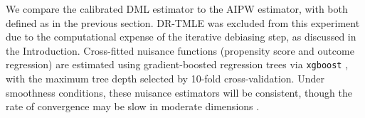 \documentclass[11pt]{article}
\theoremstyle{plain}
\begin{document}
We compare the calibrated DML estimator to the AIPW estimator, with both defined as in the previous section. DR-TMLE was excluded from this experiment due to the computational expense of the iterative debiasing step, as discussed in the Introduction. Cross-fitted nuisance functions (propensity score and outcome regression) are estimated using gradient-boosted regression trees via \texttt{xgboost} \citep{chen2015xgboost}, with the maximum tree depth selected by 10-fold cross-validation. Under smoothness conditions, these nuisance estimators will be consistent, though the rate of convergence may be slow in moderate dimensions \citep{zhang2005boosting}.

 





\end{document}
